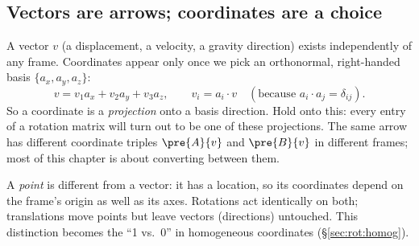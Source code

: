 \subsection{Vectors are arrows; coordinates are a choice}\label{sec:rot:vectors-are-arrows}
A vector $v$ (a displacement, a velocity, a gravity direction) exists independently of any frame. Coordinates appear only once we pick an orthonormal, right-handed basis $\{a_x,a_y,a_z\}$:
\[
v = v_1 a_x + v_2 a_y + v_3 a_z,\qquad v_i = a_i\cdot v \quad(\text{because } a_i\cdot a_j=\delta_{ij}).
\]
So a coordinate is a \emph{projection} onto a basis direction. Hold onto this: every entry of a rotation matrix will turn out to be one of these projections. The same arrow has different coordinate triples $\pre{A}{v}$ and $\pre{B}{v}$ in different frames; most of this chapter is about converting between them.

A \emph{point} is different from a vector: it has a location, so its coordinates depend on the frame's origin as well as its axes. Rotations act identically on both; translations move points but leave vectors (directions) untouched. This distinction becomes the ``1 vs.\ 0'' in homogeneous coordinates (\S\ref{sec:rot:homog}).
